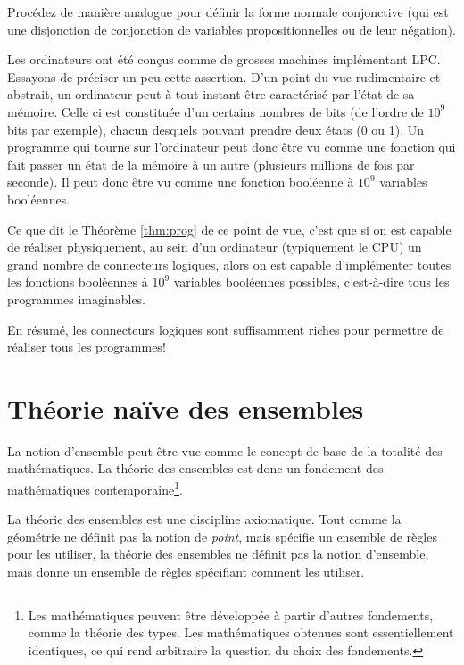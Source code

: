 \documentclass[french,course,oneside,theoremnosection]{lecture}
\newenvironment{further}[1]
{\begin{tcolorbox}[colframe=gray!50, colback=gray!5, arc=0pt, outer arc=0pt, boxrule=0.5pt, title=#1, breakable]}
{\end{tcolorbox}}
\begin{document}
\begin{exercise}
Procédez de manière analogue pour définir la forme normale conjonctive (qui est une disjonction de conjonction de variables propositionnelles ou de leur négation).
\end{exercise}

\begin{further}{L'ordinateur: une grosse machine logique}
Les ordinateurs ont été conçus comme de grosses machines implémentant LPC. Essayons de préciser un peu cette assertion. D'un point du vue rudimentaire et abstrait, un ordinateur peut à tout instant être caractérisé par l'état de sa mémoire. Celle ci est constituée d'un certains nombres de bits (de l'ordre de $10^9$ bits par exemple), chacun desquels pouvant prendre deux états (0 ou 1). Un programme qui tourne sur l'ordinateur peut donc être vu comme une fonction qui fait passer un état de la mémoire à un autre (plusieurs millions de fois par seconde). Il peut donc être vu comme une fonction booléenne à $10^9$ variables booléennes.
\medskip

Ce que dit le Théorème \ref{thm:prog} de ce point de vue, c'est que si on est capable de réaliser physiquement, au sein d'un ordinateur (typiquement le CPU) un grand nombre de connecteurs logiques, alors on est capable d'implémenter toutes les fonctions booléennes à $10^9$ variables booléennes possibles, c'est-à-dire tous les programmes imaginables.
\medskip

En résumé, les connecteurs logiques sont suffisamment riches pour permettre de réaliser tous les programmes!
\end{further}


\newpage

\section{Théorie naïve des ensembles}

La notion d'ensemble peut-être vue comme le concept de base de la totalité des mathématiques. La théorie des ensembles est donc un fondement des mathématiques contemporaine\footnote{Les mathématiques peuvent être développée à partir d'autres fondements, comme la théorie des types. Les mathématiques obtenues sont essentiellement identiques, ce qui rend arbitraire la question du choix des fondements.}.

La théorie des ensembles est une discipline axiomatique. Tout comme la géométrie ne définit pas la notion de \emph{point}, mais spécifie un ensemble de règles pour les utiliser, la théorie des ensembles ne définit pas la notion d'ensemble, mais donne un ensemble de règles spécifiant comment les utiliser.
\end{document}
